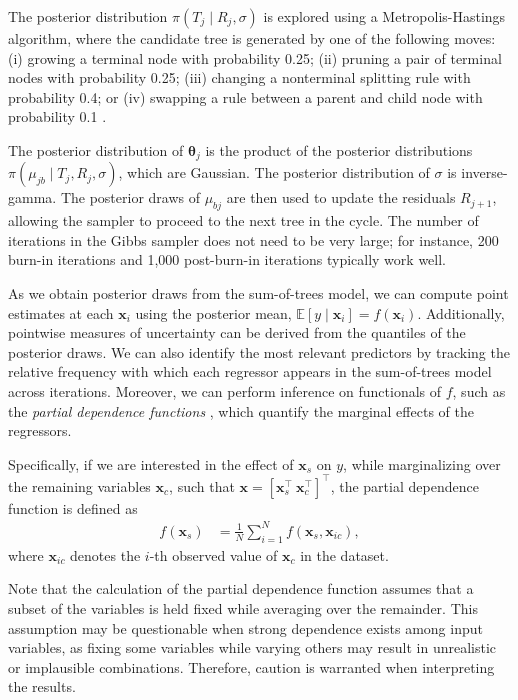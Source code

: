 The posterior distribution \( \pi(T_j \mid R_j, \sigma) \) is explored using a Metropolis-Hastings algorithm, where the candidate tree is generated by one of the following moves: (i) growing a terminal node with probability 0.25; (ii) pruning a pair of terminal nodes with probability 0.25; (iii) changing a nonterminal splitting rule with probability 0.4; or (iv) swapping a rule between a parent and child node with probability 0.1 \cite{chipman1998bayesian}.

The posterior distribution of \( \boldsymbol{\theta}_j \) is the product of the posterior distributions \( \pi(\mu_{jb} \mid T_j, R_j, \sigma) \), which are Gaussian. The posterior distribution of \( \sigma \) is inverse-gamma. The posterior draws of \( \mu_{bj} \) are then used to update the residuals \( R_{j+1} \), allowing the sampler to proceed to the next tree in the cycle. The number of iterations in the Gibbs sampler does not need to be very large; for instance, 200 burn-in iterations and 1,000 post-burn-in iterations typically work well.

As we obtain posterior draws from the sum-of-trees model, we can compute point estimates at each \( \mathbf{x}_i \) using the posterior mean, \( \mathbb{E}[y \mid \mathbf{x}_i] = f(\mathbf{x}_i) \). Additionally, pointwise measures of uncertainty can be derived from the quantiles of the posterior draws. We can also identify the most relevant predictors by tracking the relative frequency with which each regressor appears in the sum-of-trees model across iterations. Moreover, we can perform inference on functionals of \( f \), such as the \textit{partial dependence functions} \cite{friedman2001greedy}, which quantify the marginal effects of the regressors.

Specifically, if we are interested in the effect of \( \mathbf{x}_s \) on \( y \), while marginalizing over the remaining variables \( \mathbf{x}_c \), such that \( \mathbf{x} = [\mathbf{x}_s^{\top} \ \mathbf{x}_c^{\top}]^{\top} \), the partial dependence function is defined as
\begin{align*}
	f(\mathbf{x}_s) &= \frac{1}{N} \sum_{i=1}^N f(\mathbf{x}_s, \mathbf{x}_{ic}),
\end{align*}
where \( \mathbf{x}_{ic} \) denotes the \( i \)-th observed value of \( \mathbf{x}_c \) in the dataset.

Note that the calculation of the partial dependence function assumes that a subset of the variables is held fixed while averaging over the remainder. This assumption may be questionable when strong dependence exists among input variables, as fixing some variables while varying others may result in unrealistic or implausible combinations. Therefore, caution is warranted when interpreting the results.

